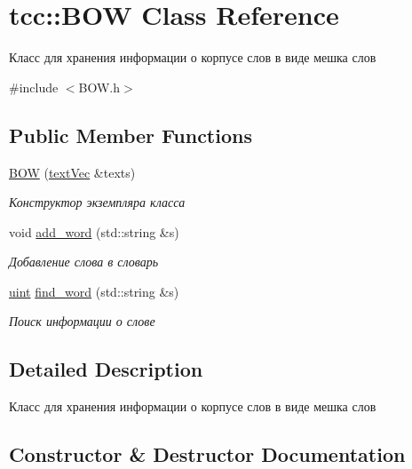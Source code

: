 \hypertarget{classtcc_1_1_b_o_w}{}\section{tcc\+:\+:B\+OW Class Reference}
\label{classtcc_1_1_b_o_w}


Класс для хранения информации о корпусе слов в виде мешка слов  




{\ttfamily \#include $<$B\+O\+W.\+h$>$}

\subsection*{Public Member Functions}
\begin{DoxyCompactItemize}
\item 
\hyperlink{classtcc_1_1_b_o_w_add04201669428662c6446d6d6dfb390c}{B\+OW} (\hyperlink{namespacetcc_a9bdf9e81347b7904a6a7f8427d6465dc}{text\+Vec} \&texts)
\begin{DoxyCompactList}\small\item\em Конструктор экземпляра класса \end{DoxyCompactList}\item 
void \hyperlink{classtcc_1_1_b_o_w_aa46799ba0df5171e704c0d633c498d04}{add\+\_\+word} (std\+::string \&s)
\begin{DoxyCompactList}\small\item\em Добавление слова в словарь \end{DoxyCompactList}\item 
\hyperlink{group__aliases_gae00908f082db728f73e52c3b4932261a}{uint} \hyperlink{classtcc_1_1_b_o_w_a59df3d61c19022ddad6232945eec37ff}{find\+\_\+word} (std\+::string \&s)
\begin{DoxyCompactList}\small\item\em Поиск информации о слове \end{DoxyCompactList}\end{DoxyCompactItemize}


\subsection{Detailed Description}
Класс для хранения информации о корпусе слов в виде мешка слов 

\subsection{Constructor \& Destructor Documentation}
